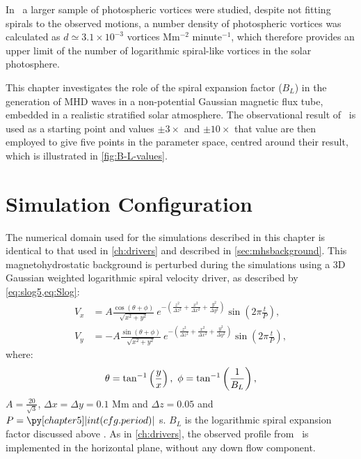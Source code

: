 In~\cite{bonet2010} a larger sample of photospheric vortices were studied, despite not fitting spirals to the observed motions, a number density of photospheric vortices was calculated as $d \simeq 3.1 \times 10^{-3}$ vortices Mm$^{-2}$ minute$^{-1}$, which therefore provides an upper limit of the number of logarithmic spiral-like vortices in the solar photosphere.

This chapter investigates the role of the spiral expansion factor ($B_L$) in the generation of MHD waves in a non-potential Gaussian magnetic flux tube, embedded in a realistic stratified solar atmosphere.
The observational result of~\cite{bonet2008} is used as a starting point and values $\pm 3\times$ and $\pm 10\times$ that value are then employed to give five points in the parameter space, centred around their result, which is illustrated in \cref{fig:B-L-values}.


\section{Simulation Configuration}\label{sec:simconfig}
The numerical domain used for the simulations described in this chapter is identical to that used in \cref{ch:drivers} and described in \cref{sec:mhsbackground}.
This magnetohydrostatic background is perturbed during the simulations using a 3D Gaussian weighted logarithmic spiral velocity driver, as described by \cref{eq:slog5,eq:Slog}:
\begin{subequations}
    \begin{align}
    V_x &= A \frac{\cos(\theta + \phi)}{\sqrt{x^2 + y^2}}\ e^{-\left(\frac{z^2}{\Delta z^2} + \frac{x^2}{\Delta x^2} + \frac{y^2}{\Delta y^2}\right)} \sin \left(2\pi \frac{t}{P}\right),\\
    V_y &= - A \frac{\sin(\theta + \phi)}{\sqrt{x^2 + y^2}}\ e^{-\left(\frac{z^2}{\Delta z^2} + \frac{x^2}{\Delta x^2} + \frac{y^2}{\Delta y^2}\right)} \sin \left(2\pi \frac{t}{P}\right),
    \end{align}
    \label{eq:slog5}
\end{subequations}
where:
\begin{equation*}
\theta = \tan^{-1}\left(\frac{y}{x}\right),\ \phi = \tan^{-1}\left(\frac{1}{B_L}\right),\notag
\end{equation*}
$A=\frac{20}{\sqrt{3}}$, $\Delta x = \Delta y = 0.1$ Mm and $\Delta z = 0.05$ and $P=\py[chapter5]|int(cfg.period)|$ s.
$B_L$ is the logarithmic spiral expansion factor discussed above
\citep{mumford2015}.
As in \cref{ch:drivers}, the observed profile from~\cite{bonet2008} is implemented in the horizontal plane, without any down flow component.


